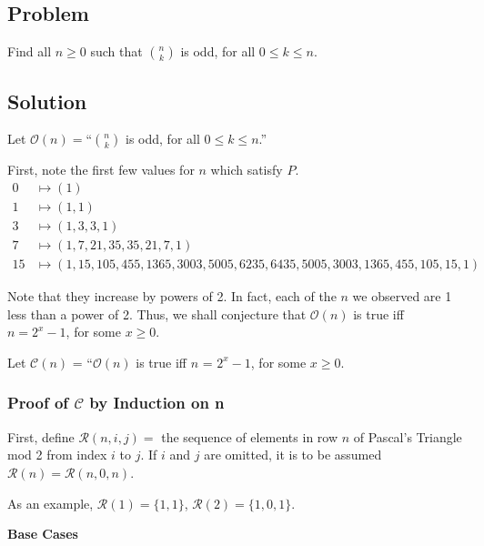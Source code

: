 \documentclass{article}
\newcommand{\pred}{\mathcal{O}}
\newcommand{\conject}{\mathcal{C}}
\newcommand{\modrow}{\mathcal{R}}
\begin{document}
\begin{center}\item \section*{Problem}\end{center}

Find all $n \geq 0$ such that ${n \choose k}$ is odd, for all $0\leq k \leq n$.

\begin{center}\item \section*{Solution}\end{center}

Let $\pred(n) = $``${n \choose k}$ is odd, for all $0 \leq k \leq n$.''

First, note the first few values for $n$ which satisfy $P$.
\begin{align*}
  0 &\mapsto (1)\\
  1 &\mapsto (1,1)\\
  3 &\mapsto (1,3,3,1)\\
  7 &\mapsto (1,7,21,35,35,21,7,1)\\
  15 &\mapsto (1,15,105,455,1365,3003,5005,6235,6435,5005,3003,1365,455,105,15,1)
\end{align*}


Note that they increase by powers of 2. In fact, each of the $n$ we observed are 1 less than a power of 2. Thus, we shall conjecture that $\pred(n)$ is true iff $n = 2^x-1$, for some $x \geq 0$.

Let $\conject(n)$ = ``$\pred(n)$ is true iff $n$ = $2^x-1$, for some $x\geq 0$.


\begin{center}\item \subsubsection*{Proof of $\conject$ by Induction on n}\end{center}

First, define $\modrow(n,i,j) = $ the sequence of elements in row $n$ of Pascal's Triangle mod 2 from index $i$ to $j$. If $i$ and $j$ are omitted, it is to be assumed $\modrow(n) = \modrow(n, 0, n)$.

As an example, $\modrow(1) = \{1,1\}$, $\modrow(2)= \{1,0,1\}$.
\begin{center}\item \textbf{Base Cases} \end{center}
\end{document}
